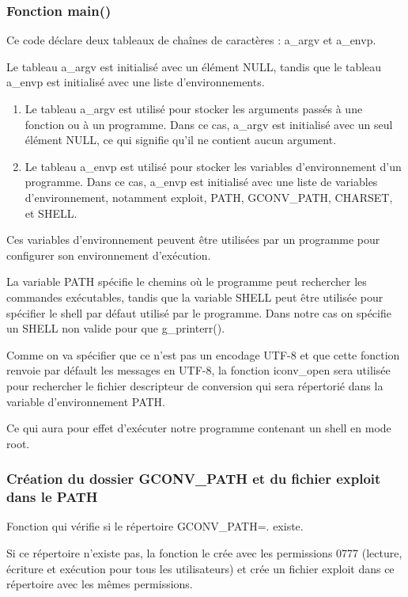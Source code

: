 \documentclass[12pt,a4paper]{article}
\begin{document}
			\subsubsection{Fonction main()} 
			  
             \begin{flushleft}
                \noindent Ce code déclare deux tableaux de chaînes de caractères : a\_argv et a\_envp. 
                \item Le tableau a\_argv est initialisé avec un élément NULL, tandis que le tableau a\_envp est initialisé avec une liste d'environnements.
                \begin{enumerate}
                    \item Le tableau a\_argv est utilisé pour stocker les arguments passés à une fonction ou à un programme. Dans ce cas, a\_argv est initialisé avec un seul élément NULL, ce qui signifie qu'il ne contient aucun argument.
                    \item Le tableau a\_envp est utilisé pour stocker les variables d'environnement d'un programme. Dans ce cas, a\_envp est initialisé avec une liste de variables d'environnement, notamment exploit, PATH, GCONV\_PATH, CHARSET, et SHELL. 
                \end{enumerate}
                \item Ces variables d'environnement peuvent être utilisées par un programme pour configurer son environnement d'exécution. 
                \item La variable PATH spécifie le chemins où le programme peut rechercher les commandes exécutables, tandis que la variable SHELL peut être utilisée pour spécifier le shell par défaut utilisé par le programme. Dans notre cas on spécifie un SHELL non valide pour que g\_printerr(). 
                \item Comme on va spécifier que ce n'est pas un encodage UTF-8 et que cette fonction renvoie par défault les messages en UTF-8, la fonction iconv\_open sera utilisée pour rechercher le fichier descripteur de conversion qui sera répertorié dans la variable d'environnement PATH.
                \item Ce qui aura pour effet d'exécuter notre programme contenant un shell en mode root.
            \end{flushleft}
   		\subsubsection{Création du dossier GCONV\_PATH et du fichier exploit dans le PATH} 
   		  
            \begin{flushleft}
                \noindent Fonction qui vérifie si le répertoire GCONV\_PATH=. existe. 
                \item Si ce répertoire n'existe pas, la fonction le crée avec les permissions 0777 (lecture, écriture et exécution pour tous les utilisateurs) et crée un fichier exploit dans ce répertoire avec les mêmes permissions.
            \end{flushleft}
     
\end{document}
